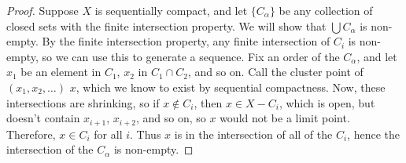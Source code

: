 \begin{proof}
	
	Suppose $X$ is sequentially compact, and let $\{C_\alpha\}$ be any collection of closed sets with the finite intersection property.  We will show that $\bigcup C_\alpha$ is non-empty.  By the finite intersection property, any finite intersection of $C_i$ is non-empty, so we can use this to generate a sequence.  Fix an order of the $C_\alpha$, and let $x_1$ be an element in $C_1$, $x_2$ in $C_1\cap C_2$, and so on.  Call the cluster point of $(x_1,x_2,\dots)$ $x$, which we know to exist by sequential compactness.  Now, these intersections are shrinking, so if $x\notin C_i$, then $x\in X{-}C_i$, which is open, but doesn't contain $x_{i+1}$, $x_{i+2}$, and so on, so $x$ would not be a limit point.  Therefore, $x\in C_i$ for all $i$.  Thus $x$ is in the intersection of all of the $C_i$, hence the intersection of the $C_\alpha$ is non-empty.
	
	
	
\end{proof}
